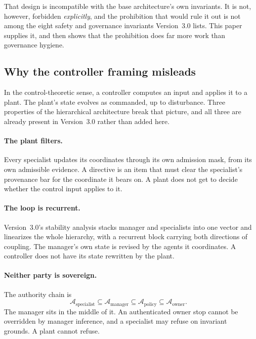 \documentclass[11pt]{article}
\begin{document}
That design is incompatible with the base architecture's own invariants. It is not, however, forbidden \emph{explicitly}, and the prohibition that would rule it out is not among the eight safety and governance invariants Version~3.0 lists. This paper supplies it, and then shows that the prohibition does far more work than governance hygiene.

\subsection{Why the controller framing misleads}

In the control-theoretic sense, a controller computes an input and applies it to a plant. The plant's state evolves as commanded, up to disturbance. Three properties of the hierarchical architecture break that picture, and all three are already present in Version~3.0 rather than added here.

\paragraph{The plant filters.} Every specialist updates its coordinates through its own admission mask, from its own admissible evidence. A directive is an item that must clear the specialist's provenance bar for the coordinate it bears on. A plant does not get to decide whether the control input applies to it.

\paragraph{The loop is recurrent.} Version~3.0's stability analysis stacks manager and specialists into one vector and linearizes the whole hierarchy, with a recurrent block carrying both directions of coupling. The manager's own state is revised by the agents it coordinates. A controller does not have its state rewritten by the plant.

\paragraph{Neither party is sovereign.} The authority chain is
\[
\mathcal{A}_{\mathrm{specialist}}\subseteq\mathcal{A}_{\mathrm{manager}}\subseteq\mathcal{A}_{\mathrm{policy}}\subseteq\mathcal{A}_{\mathrm{owner}} .
\]
The manager sits in the middle of it. An authenticated owner stop cannot be overridden by manager inference, and a specialist may refuse on invariant grounds. A plant cannot refuse.
\end{document}
